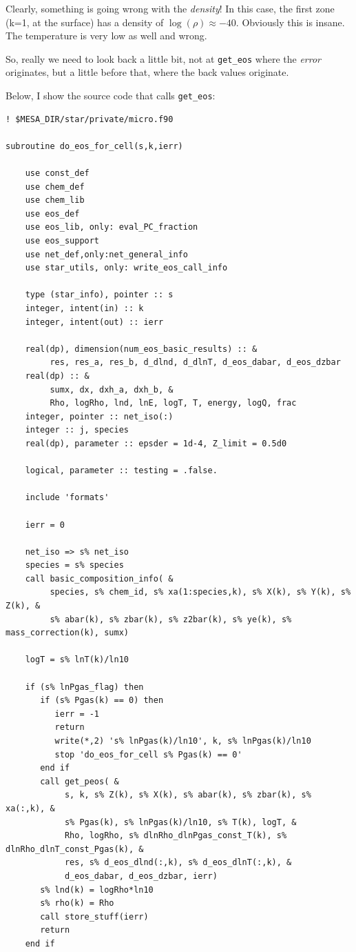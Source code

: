 \documentclass[a4paper,10pt]{article}
\begin{document}
Clearly, something is going wrong with the \emph{density}! In this case, the first zone (k=1, at the surface) has a density of \(\log(\rho ) \approx -40\). Obviously this is insane. The temperature is very low as well and wrong.

So, really we need to look back a little bit, not at \lstinline[style=output, breaklines=true]|get_eos| where the \emph{error} originates, but a little before that, where the back values originate.

Below, I show the source code that calls \lstinline[style=output, breaklines=true]|get_eos|:
\nextpage
\begin{verbatim}
! $MESA_DIR/star/private/micro.f90

subroutine do_eos_for_cell(s,k,ierr)

    use const_def
    use chem_def
    use chem_lib
    use eos_def
    use eos_lib, only: eval_PC_fraction
    use eos_support
    use net_def,only:net_general_info
    use star_utils, only: write_eos_call_info

    type (star_info), pointer :: s
    integer, intent(in) :: k
    integer, intent(out) :: ierr

    real(dp), dimension(num_eos_basic_results) :: &
         res, res_a, res_b, d_dlnd, d_dlnT, d_eos_dabar, d_eos_dzbar
    real(dp) :: &
         sumx, dx, dxh_a, dxh_b, &
         Rho, logRho, lnd, lnE, logT, T, energy, logQ, frac
    integer, pointer :: net_iso(:)
    integer :: j, species
    real(dp), parameter :: epsder = 1d-4, Z_limit = 0.5d0

    logical, parameter :: testing = .false.

    include 'formats'

    ierr = 0

    net_iso => s% net_iso
    species = s% species
    call basic_composition_info( &
         species, s% chem_id, s% xa(1:species,k), s% X(k), s% Y(k), s% Z(k), &
         s% abar(k), s% zbar(k), s% z2bar(k), s% ye(k), s% mass_correction(k), sumx)

    logT = s% lnT(k)/ln10

    if (s% lnPgas_flag) then
       if (s% Pgas(k) == 0) then
          ierr = -1
          return
          write(*,2) 's% lnPgas(k)/ln10', k, s% lnPgas(k)/ln10
          stop 'do_eos_for_cell s% Pgas(k) == 0'
       end if
       call get_peos( &
            s, k, s% Z(k), s% X(k), s% abar(k), s% zbar(k), s% xa(:,k), &
            s% Pgas(k), s% lnPgas(k)/ln10, s% T(k), logT, &
            Rho, logRho, s% dlnRho_dlnPgas_const_T(k), s% dlnRho_dlnT_const_Pgas(k), &
            res, s% d_eos_dlnd(:,k), s% d_eos_dlnT(:,k), &
            d_eos_dabar, d_eos_dzbar, ierr)
       s% lnd(k) = logRho*ln10
       s% rho(k) = Rho
       call store_stuff(ierr)
       return
    end if


\end{verbatim}
\end{document}
